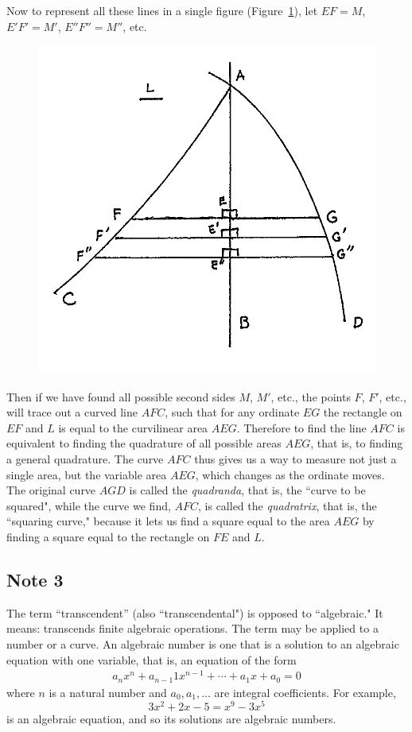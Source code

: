 \documentclass[twoside,openright]{article}
\begin{document}
Now to represent all these lines in a single figure
(Figure~\ref{quadratrix}), let $EF = M$, $E'F' = M'$, $E''F'' = M''$,
etc.
\begin{figure}[htp]
\begin{center}
\includegraphics[width=.75\textwidth]{fig/Figure29C}
\caption{}
\label{quadratrix}
\vspace{-10pt}
\end{center}
\end{figure} 
Then if we have found all possible second sides $M$, $M'$, etc., the
points $F$, $F'$, etc., will trace out a curved line $AFC$, such that
for any ordinate $EG$ the rectangle on $EF$ and $L$ is equal to the
curvilinear area $AEG$.  Therefore to find the line $AFC$ is
equivalent to finding the quadrature of all possible areas $AEG$, that
is, to finding a general quadrature.  The curve $AFC$ thus gives us a
way to measure not just a single area, but the variable area $AEG$,
which changes as the ordinate moves.  The original curve $AGD$ is
called the {\em quadranda}, that is, the ``curve to be squared", while
the curve we find, $AFC$, is called the {\em
  quadratrix}\label{quaddef}, that is, the ``squaring curve," because
it lets us find a square equal to the area $AEG$ by finding a square
equal to the rectangle on $FE$ and $L$.

\subsection*{Note 3}
\label{crg3}
The term ``transcendent'' (also ``transcendental") is opposed to
``algebraic." It means: transcends finite algebraic operations. The
term may be applied to a number or a curve. An algebraic
number is one that is a solution to an algebraic equation with one
variable, that is, an equation of the form
\begin{align*}
a_{n}x^n+a_{n-1}1x^{n-1}+\cdots+a_1x+a_0=0
\end{align*}
where $n$ is a natural number and $a_0, a_1, \dotsc$ are integral coefficients.
For example,
$$3x^2 + 2x -5  = x^9 - 3x^5$$
is an algebraic equation, and so its solutions are algebraic numbers.
\end{document}
